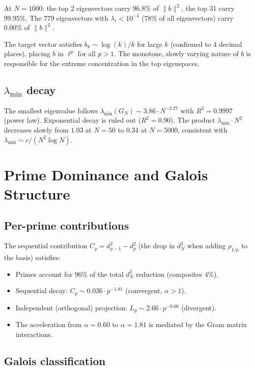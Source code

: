 \documentclass[11pt,a4paper]{article}
\begin{document}
At $N = 1000$: the top 2 eigenvectors carry $96.8\%$ of $\|b\|^2$, the top 31 carry $99.95\%$. The 779 eigenvectors with $\lambda_i < 10^{-4}$ (78\% of all eigenvectors) carry $0.00\%$ of $\|b\|^2$.

The target vector satisfies $b_k \sim \log(k)/k$ for large $k$ (confirmed to 4 decimal places), placing $b$ in $\ell^p$ for all $p > 1$. The monotone, slowly varying nature of $b$ is responsible for the extreme concentration in the top eigenspaces.

\subsection{$\lambda_{\min}$ decay}

The smallest eigenvalue follows $\lambda_{\min}(G_N) \sim 3.86 \cdot N^{-2.27}$ with $R^2 = 0.9997$ (power law). Exponential decay is ruled out ($R^2 = 0.90$). The product $\lambda_{\min} \cdot N^2$ decreases slowly from $1.03$ at $N = 50$ to $0.34$ at $N = 5000$, consistent with $\lambda_{\min} \sim c / (N^2 \log N)$.

\section{Prime Dominance and Galois Structure}

\subsection{Per-prime contributions}

The sequential contribution $C_p = d_{p-1}^2 - d_p^2$ (the drop in $d_N^2$ when adding $\rho_{1/p}$ to the basis) satisfies:
\begin{itemize}
\item Primes account for $96\%$ of the total $d_N^2$ reduction (composites $4\%$).
\item Sequential decay: $C_p \sim 0.036 \cdot p^{-1.81}$ (convergent, $\alpha > 1$).
\item Independent (orthogonal) projection: $L_p \sim 2.66 \cdot p^{-0.60}$ (divergent).
\item The acceleration from $\alpha = 0.60$ to $\alpha = 1.81$ is mediated by the Gram matrix interactions.
\end{itemize}

\subsection{Galois classification}
\end{document}
